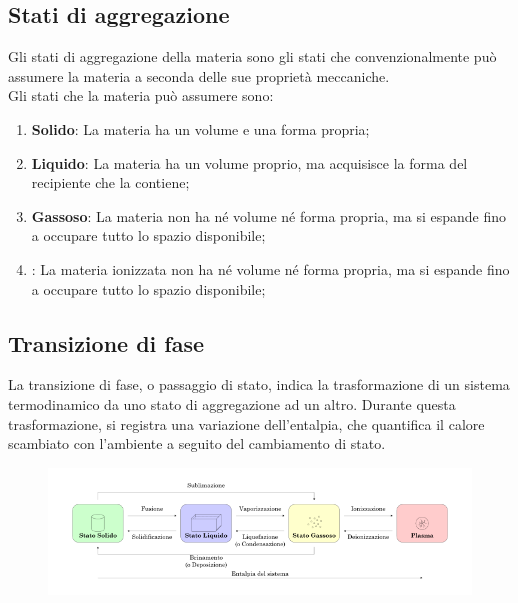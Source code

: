 \documentclass{article}
\begin{document}
\subsection{Stati di aggregazione}
Gli stati di aggregazione della materia sono gli stati che convenzionalmente può assumere la
materia a seconda delle sue proprietà meccaniche.\\
Gli stati che la materia può assumere sono:
\begin{enumerate}
    \item \textbf{Solido}: La materia ha un volume e una forma propria;
    \item \textbf{Liquido}: La materia ha un volume proprio, ma acquisisce la forma del
        recipiente che la contiene;
    \item \textbf{Gassoso}: La materia non ha né volume né forma propria, ma si espande fino
        a occupare tutto lo spazio disponibile;
    \item \hyperlink{ioni}{}:
    La materia ionizzata non ha né volume né forma propria, ma si espande fino
    a occupare tutto lo spazio disponibile;
\end{enumerate}

\subsection{Transizione di fase}
La transizione di fase, o passaggio di stato, indica la trasformazione di un sistema termodinamico
da uno stato di aggregazione ad un altro. Durante questa trasformazione, si registra una
variazione dell'entalpia, che quantifica il calore scambiato con l'ambiente a seguito del
cambiamento di stato.

\vspace{-.5cm}
\begin{figure}[h]
    \begin{center}
        \includegraphics[width=1\textwidth]{Fisica_materia_passaggi_stato_1_it.png}
    \end{center}
\end{figure}
\end{document}

